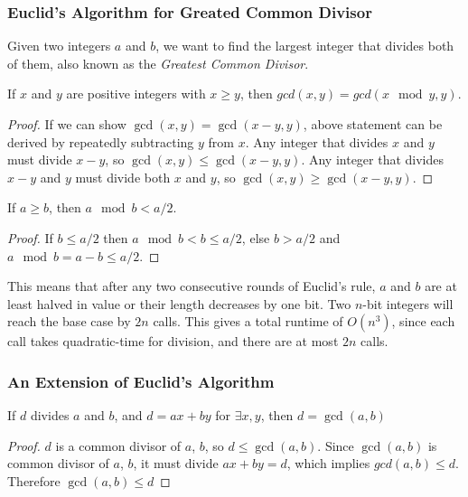 \subsubsection{Euclid's Algorithm for Greated Common Divisor}
Given two integers $a$ and $b$, we want to find the largest integer that divides both of them, also known as the \emph{Greatest Common Divisor}.
\begin{thm}
  If $x$ and $y$ are positive integers with $x \geq y$, then $gcd(x, y) = gcd(x \mod y, y)$.
\end{thm}
\begin{proof}
  If we can show $\gcd(x, y) = \gcd(x-y, y)$, above statement can be derived by repeatedly subtracting $y$ from $x$.
  Any integer that divides $x$ and $y$ must divide $x-y$, so $\gcd(x, y) \leq \gcd(x - y, y)$.
  Any integer that divides $x-y$ and $y$ must divide both $x$ and $y$, so $\gcd(x, y) \geq \gcd(x-y, y)$.
\end{proof}

\begin{lemma}
  If $a \geq b$, then $a \mod b < a / 2$.
\end{lemma}
\begin{proof}
	If $b \leq a/2$ then $a \mod b < b \leq a/2$, else $b > a/2$ and $a \mod b = a - b \leq a/2$.
\end{proof}
This means that after any two consecutive rounds of Euclid's rule, $a$ and $b$ are at least halved in value or their length decreases by one bit.
Two $n$-bit integers will reach the base case by $2n$ calls.
This gives a total runtime of $O(n^3)$, since each call takes quadratic-time for division, and there are at most $2n$ calls.

\subsubsection{An Extension of Euclid's Algorithm}
\begin{lemma}
  If $d$ divides $a$ and $b$, and $d = ax + by$ for $\exists x, y$, then $d = \gcd(a, b)$
\end{lemma}
\begin{proof}
	  $d$ is a common divisor of $a$, $b$, so $d \leq \gcd(a, b)$. Since $\gcd(a, b)$ is common divisor of $a$, $b$, it must divide $ax + by = d$, which implies $gcd(a, b) \leq d$. Therefore $\gcd(a, b) \leq d$
\end{proof}


